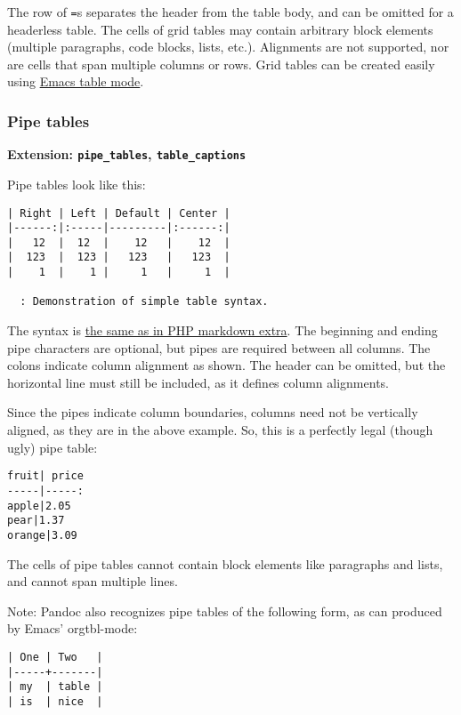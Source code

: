\documentclass[]{article}
\begin{document}
The row of \texttt{=}s separates the header from the table body, and can
be omitted for a headerless table. The cells of grid tables may contain
arbitrary block elements (multiple paragraphs, code blocks, lists,
etc.). Alignments are not supported, nor are cells that span multiple
columns or rows. Grid tables can be created easily using
\href{http://table.sourceforge.net/}{Emacs table mode}.

\subsubsection{Pipe tables}

\textbf{Extension: \texttt{pipe\_tables}, \texttt{table\_captions}}

Pipe tables look like this:

\begin{verbatim}
| Right | Left | Default | Center |
|------:|:-----|---------|:------:|
|   12  |  12  |    12   |    12  |
|  123  |  123 |   123   |   123  |
|    1  |    1 |     1   |     1  |

  : Demonstration of simple table syntax.
\end{verbatim}

The syntax is
\href{http://michelf.ca/projects/php-markdown/extra/\#table}{the same as
in PHP markdown extra}. The beginning and ending pipe characters are
optional, but pipes are required between all columns. The colons
indicate column alignment as shown. The header can be omitted, but the
horizontal line must still be included, as it defines column alignments.

Since the pipes indicate column boundaries, columns need not be
vertically aligned, as they are in the above example. So, this is a
perfectly legal (though ugly) pipe table:

\begin{verbatim}
fruit| price
-----|-----:
apple|2.05
pear|1.37
orange|3.09
\end{verbatim}

The cells of pipe tables cannot contain block elements like paragraphs
and lists, and cannot span multiple lines.

Note: Pandoc also recognizes pipe tables of the following form, as can
produced by Emacs' orgtbl-mode:

\begin{verbatim}
| One | Two   |
|-----+-------|
| my  | table |
| is  | nice  |
\end{verbatim}
\end{document}
